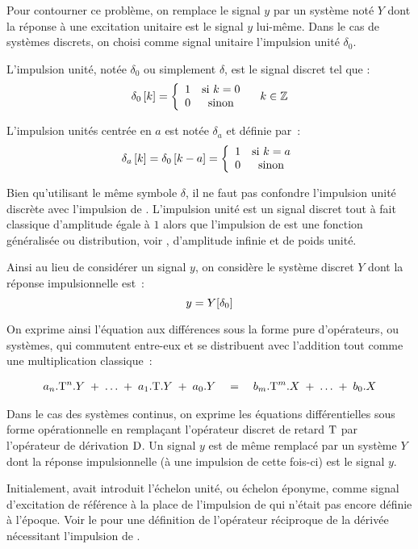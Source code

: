 Pour contourner ce problème, on remplace le signal $y$ par un système
noté $Y$ dont la réponse à une excitation unitaire est le signal $y$
lui-même. Dans le cas de systèmes discrets, on choisi comme signal
unitaire l'impulsion unité $\delta_{0}$.

\begin{definition}
  \label{def:impulsion_unite}
  L'impulsion unité, notée $\delta_0$ ou simplement $\delta$, est le signal discret tel que :
  $$
  \delta_0\left[k\right]=\left\{\begin{array}{cc} {1} & {\text{si } k=0}\\ {0} & {\text{sinon}}\\ \end{array}\right. \quad k\in\mathbb{Z}
  $$

  L'impulsion unités centrée en $a$ est notée $\delta_a$ et définie par~:
  $$
  \delta_a\left[k\right]=\delta_0\left[k-a\right] = \left\{\begin{array}{cc} {1} & {\text{si } k=a}\\ {0} & {\text{sinon}}\\ \end{array}\right.
  $$

  Bien qu'utilisant le même symbole $\delta$, il ne faut pas confondre
  l'impulsion unité discrète avec l'impulsion de \Dirac. L'impulsion
  unité est un signal discret tout à fait classique d'amplitude égale
  à $1$ alors que l'impulsion de \Dirac{} est une fonction généralisée
  ou distribution, voir , d'amplitude infinie et de
  poids unité.
\end{definition}

Ainsi au lieu de considérer un signal $y$, on considère le système discret $Y$ dont la réponse impulsionnelle est~:
\begin{equation}
  y = Y\!\left[\delta_0\right]
\end{equation}



On exprime ainsi l'équation aux différences sous la forme pure
d'opérateurs, ou systèmes, qui commutent entre-eux et se distribuent
avec l'addition tout comme une multiplication classique~:

\begin{eqnarray}
  a_n.\mathrm{T}^n.Y\; +\; \ldots \;+\; a_1.\mathrm{T}.Y \;+\; a_0.Y \quad  = \quad b_m.\mathrm{T}^m.X \;+\; \ldots \;+\; b_0.X
\end{eqnarray}

\begin{remarque}
  Dans le cas des systèmes continus, on exprime les équations
  différentielles sous forme opérationnelle en remplaçant l'opérateur
  discret de retard $\mathrm{T}$ par l'opérateur de dérivation $\mathrm{D}$. Un
  signal $y$ est de même remplacé par un système $Y$ dont la réponse
  impulsionnelle (à une impulsion de \Dirac{} cette fois-ci) est le
  signal $y$.

  Initialement, \Heaviside{} avait introduit l'échelon unité, ou
  échelon éponyme, comme signal d'excitation de référence à la place
  de l'impulsion de \Dirac{} qui n'était pas encore définie à
  l'époque. Voir le  pour une définition de
  l'opérateur réciproque de la dérivée nécessitant l'impulsion de
  \Dirac{}.
\end{remarque}

